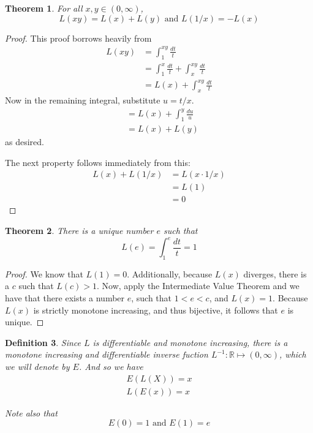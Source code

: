 \documentclass[12pt]{article}
\theoremstyle{mystyle}
\newtheorem{thm}{Theorem}
\newtheorem{defn}[thm]{Definition}
\newcommand{\R}{\mathbb{R}}
\begin{document}
\begin{thm}
  For all $x,y \in (0, \infty)$,
  $$ L(xy) = L(x) + L(y) \text{ and } L(1/x) = -L(x)$$
\end{thm}
\begin{proof}
  This proof borrows heavily from \cite[Theorem 6.1]{howie}
  \begin{align*}
    L(xy) &= \int_{1}^{xy} \frac{dt}{t} \\
          &= \int_{1}^{x} \frac{dt}{t} + \int_{x}^{xy} \frac{dt}{t} \\
          &= L(x) + \int_{x}^{xy} \frac{dt}{t}
  \end{align*}
  Now in the remaining integral, substitute $u = t/x$. 
  \begin{align*}
          &= L(x) + \int_{1}^{y} \frac{du}{u} \\
          &= L(x) + L(y)
  \end{align*}
  as desired.
  
  The next property follows immediately from this:
  \begin{align*}
    L(x) + L(1/x) &= L(x \cdot 1/x) \\
                  &= L(1) \\
                  &= 0
  \end{align*}  

\end{proof}


\begin{thm}
  There is a unique number $e$ such that 
  $$ L(e) = \int_1^e \frac{dt}{t} = 1 $$
\end{thm}
\begin{proof}
  We know that $L(1) = 0$. Additionally, because $L(x)$ diverges, there is a $c$
  such that $L(c) > 1$. Now, apply the Intermediate Value Theorem and we have
  that there exists a number $e$, such that $1 < e < c$, and $L(x) = 1$. Because
  $L(x)$ is strictly monotone increasing, and thus bijective, it follows that
  $e$ is unique.
\end{proof}


\begin{defn}
  Since $L$ is differentiable and monotone increasing, there is a monotone
  increasing and differentiable inverse fuction $L^{-1}: \R \mapsto (0, \infty)$,
  which we will denote by $E$. And so we have
  \begin{align*}
    E(L(X)) = x \\
    L(E(x)) = x
  \end{align*}
  
  Note also that
  $$ E(0) = 1 \text{ and } E(1) = e $$
\end{defn}
\end{document}
